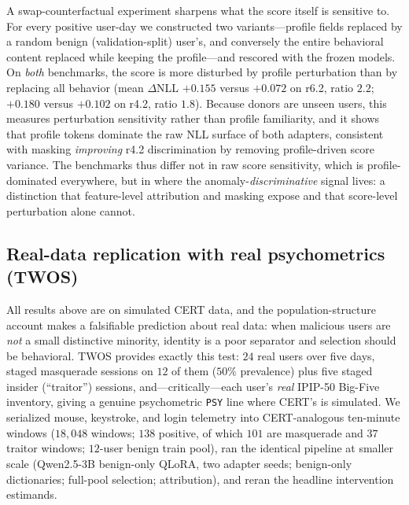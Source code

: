 \documentclass[10pt]{article} %
\newcommand{\rsix}{r6.2}
\newcommand{\rfour}{r4.2}
\begin{document}
A swap-counterfactual experiment sharpens what the score itself is sensitive
to. For every positive user-day we constructed two variants---profile fields
replaced by a random benign (validation-split) user's, and conversely the
entire behavioral content replaced while keeping the profile---and rescored
with the frozen models. On \emph{both} benchmarks, the score is more
disturbed by profile perturbation than by replacing all behavior
(mean $\Delta$NLL $+0.155$ versus $+0.072$ on \rsix{}, ratio $2.2$;
$+0.180$ versus $+0.102$ on \rfour{}, ratio $1.8$). Because donors are
unseen users, this measures perturbation sensitivity rather than profile
familiarity, and it shows that profile tokens dominate the raw NLL surface of
both adapters, consistent with masking \emph{improving} \rfour{}
discrimination by removing profile-driven score variance. The benchmarks thus
differ not in raw score sensitivity, which is profile-dominated everywhere,
but in where the anomaly-\emph{discriminative} signal lives: a distinction
that feature-level attribution and masking expose and that score-level
perturbation alone cannot.
\subsection{Real-data replication with real psychometrics (TWOS)}
\label{sec:twos}

All results above are on simulated CERT data, and the population-structure
account makes a falsifiable prediction about real data: when malicious users
are \emph{not} a small distinctive minority, identity is a poor separator
and selection should be behavioral. TWOS \citep{harilal2017twos} provides
exactly this test: $24$ real users over five days, staged masquerade
sessions on $12$ of them ($50\%$ prevalence) plus five staged insider
(``traitor'') sessions, and---critically---each
user's \emph{real} IPIP-50 Big-Five inventory, giving a genuine
psychometric \texttt{PSY} line where CERT's is simulated. We serialized
mouse, keystroke, and login telemetry into CERT-analogous ten-minute
windows ($18{,}048$ windows; $138$ positive, of which $101$ are masquerade
and $37$ traitor windows; $12$-user benign train pool),
ran the identical pipeline at smaller scale (Qwen2.5-3B benign-only QLoRA,
two adapter seeds; benign-only dictionaries; full-pool selection;
attribution), and reran the headline intervention estimands.
\end{document}
